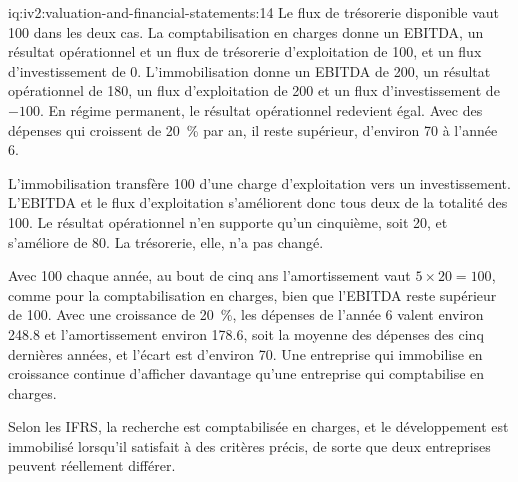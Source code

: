 \begin{solution}{iq:iv2:valuation-and-financial-statements:14}
Le flux de trésorerie disponible vaut 100 dans les deux cas. La comptabilisation en charges donne un EBITDA, un résultat opérationnel et un flux de trésorerie d'exploitation de 100, et un flux d'investissement de 0. L'immobilisation donne un EBITDA de 200, un résultat opérationnel de 180, un flux d'exploitation de 200 et un flux d'investissement de $-100$. En régime permanent, le résultat opérationnel redevient égal. Avec des dépenses qui croissent de 20~\% par an, il reste supérieur, d'environ 70 à l'année 6.

L'immobilisation transfère 100 d'une charge d'exploitation vers un investissement. L'EBITDA et le flux d'exploitation s'améliorent donc tous deux de la totalité des 100. Le résultat opérationnel n'en supporte qu'un cinquième, soit 20, et s'améliore de 80. La trésorerie, elle, n'a pas changé.

Avec 100 chaque année, au bout de cinq ans l'amortissement vaut $5 \times 20 = 100$, comme pour la comptabilisation en charges, bien que l'EBITDA reste supérieur de 100. Avec une croissance de 20~\%, les dépenses de l'année 6 valent environ 248.8 et l'amortissement environ 178.6, soit la moyenne des dépenses des cinq dernières années, et l'écart est d'environ 70. Une entreprise qui immobilise en croissance continue d'afficher davantage qu'une entreprise qui comptabilise en charges.

Selon les IFRS, la recherche est comptabilisée en charges, et le développement est immobilisé lorsqu'il satisfait à des critères précis, de sorte que deux entreprises peuvent réellement différer.

\end{solution}


